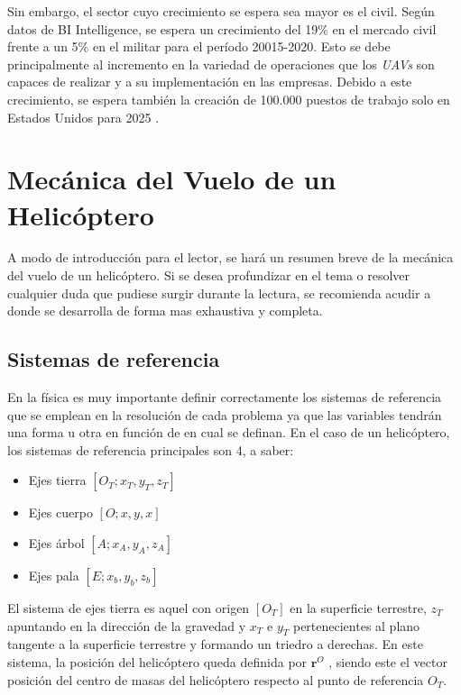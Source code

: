 Sin embargo, el sector cuyo crecimiento se espera sea mayor es el civil. Según datos de BI Intelligence, se espera un crecimiento del 19\% en el mercado civil frente a un 5\% en el militar para el período 20015-2020.
Esto se debe principalmente al incremento en la variedad de operaciones que los \emph{UAVs} son capaces de realizar y a su implementación en las empresas. Debido a este crecimiento, se espera también la creación de 100.000 puestos de trabajo solo en Estados Unidos para 2025 \citep{AUVSI}.\\

\section{Mecánica del Vuelo de un Helicóptero}
A modo de introducción para el lector, se hará un resumen breve de la mecánica del vuelo de un helicóptero. Si se desea profundizar en el tema o resolver cualquier duda que pudiese surgir durante la lectura, se recomienda acudir a \citet{Cuerva} donde se desarrolla de forma mas exhaustiva y completa.\\

\subsection{Sistemas de referencia}
En la física es muy importante definir correctamente los sistemas de referencia que se emplean en la resolución de cada problema ya que las variables tendrán una forma u otra en función de en cual se definan.
En el caso de un helicóptero, los sistemas de referencia principales son 4, a saber:
\begin{itemize}
	\item Ejes tierra $[O_{T};x_{T},y_{T},z_{T}]$
	\item Ejes cuerpo $[O;x,y,x]$
	\item Ejes árbol $[A;x_{A},y_{A},z_{A}]$
	\item Ejes pala $[E;x_{b},y_{b},z_{b}]$
\end{itemize}
El sistema de ejes tierra es aquel con origen $[O_{T}]$ en la superficie terrestre, $z_{T}$ apuntando en la dirección de la gravedad y $x_{T}$ e $y_{T}$ pertenecientes al plano tangente a la superficie terrestre y formando un triedro a derechas. En este sistema, la posición del helicóptero queda definida por $\textbf{r}^{O}$ , siendo este el vector posición del centro de masas del helicóptero respecto al punto de referencia $O_{T}$.\\

